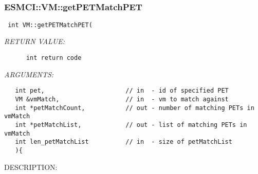  
\mbox{}\hrulefill\
 
\subsubsection [ESMCI::VM::getPETMatchPET] {ESMCI::VM::getPETMatchPET}


  
\begin{verbatim} int VM::getPETMatchPET(\end{verbatim}{\em RETURN VALUE:}
\begin{verbatim}      int return code\end{verbatim}{\em ARGUMENTS:}
\begin{verbatim}   int pet,                      // in  - id of specified PET
   VM &vmMatch,                  // in  - vm to match against
   int *petMatchCount,           // out - number of matching PETs in vmMatch
   int *petMatchList,            // out - list of matching PETs in vmMatch
   int len_petMatchList          // in  - size of petMatchList
   ){\end{verbatim}
{\sf DESCRIPTION:\\ }


